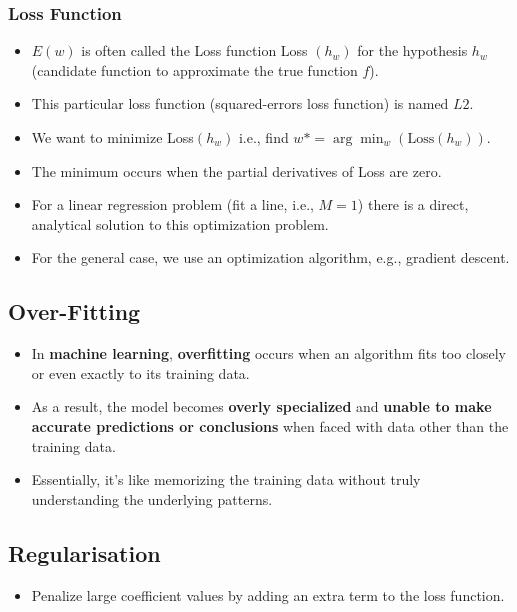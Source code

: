 \documentclass[8pt]{article}
\begin{document}
\subsubsection*{Loss Function}
\begin{itemize}
    \item \( E(w) \) is often called the Loss function Loss \( (h_w) \) for the hypothesis \( h_w \) (candidate function to approximate the true function \( f \)).
    \item This particular loss function (squared-errors loss function) is named \( L2 \).
    \item We want to minimize Loss\( (h_w) \) i.e., find \( w* = \arg\min_w(\text{Loss}(h_w)) \).
    \item The minimum occurs when the partial derivatives of Loss are zero.
    \item For a linear regression problem (fit a line, i.e., \( M=1 \)) there is a direct, analytical solution to this optimization problem.
    \item For the general case, we use an optimization algorithm, e.g., gradient descent.
\end{itemize}

\subsection*{Over-Fitting}
\begin{itemize}
    \item In \textbf{machine learning}, \textbf{overfitting} occurs when an algorithm fits too closely or even exactly to its training data.
    \item As a result, the model becomes \textbf{overly specialized} and \textbf{unable to make accurate predictions or conclusions} when faced with data other than the training data.
    \item Essentially, it’s like memorizing the training data without truly understanding the underlying patterns.
\end{itemize}

\subsection*{Regularisation}
\begin{itemize}
    \item Penalize large coefficient values by adding an extra term to the loss function.
\end{itemize}
\end{document}
